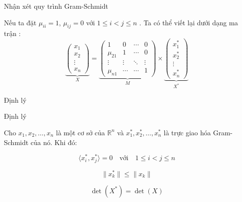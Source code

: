 \documentclass{beamer}
\numberwithin{equation}{section}
\begin{document}
\begin{frame}{Nhận xét quy trình Gram-Schmidt}




Nếu ta đặt $\mu_{ii} = 1 $, $\mu_{ij} = 0$ với $ 1\leq i < j \leq n$ . Ta có thể viết lại dưới dạng ma trận  :
$$\underbrace{\left(\begin{array}{c}
x_1\\
x_2\\
\vdots\\
x_n
\end{array}\right)}_{X} = \underbrace{\left(\begin{array}{cccc}
1 & 0 &\cdots & 0\\
\mu_{21} & 1 &\cdots & 0\\
\vdots & \vdots & \ddots &\vdots\\
\mu_{n1} &\cdots & \cdots & 1
\end{array}\right)}_{M} \times \underbrace{\left(\begin{array}{c}
x_1^*\\
x_2^*\\
\vdots\\
x_n^*
\end{array}\right)}_{X^*} $$

\end{frame}
\begin{frame}{Định lý}

\begin{block}{Định lý}

Cho $x_1, x_2, \ldots, x_n$ là một cơ sở của $\mathbb{R}^n$
và $x_1^*, x_2^*, \ldots, x_n^*$ là trực giao hóa Gram-Schmidt của nó. Khi đó:

\begin{equation} \label{equation:dinh_li_Gram-Schmidt1}
\langle x_i^*, x_j^* \rangle = 0 \quad \text{với} \quad 1 \leq i < j \leq n
\end{equation}

\begin{equation} \label{equation:dinh_li_Gram-Schmidt2}
\|x_k^*\| \leq \|x_k\|
\end{equation}

\begin{equation} \label{equation:dinh_li_Gram-Schmidt3}
\det(X^*) = \det(X)
\end{equation}

\end{block}

\end{frame}
\end{document}
